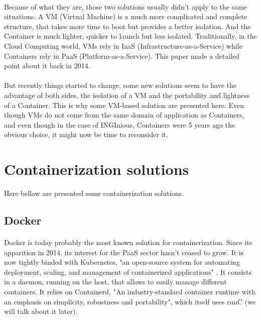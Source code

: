 \paragraph{}Because of what they are, those two solutions usually didn't apply to the same situations.  A VM (Virtual Machine) is a much more complicated and complete structure, that takes more time to boot but provides a better isolation.  And the Container is much lighter, quicker to launch but less isolated.  Traditionally, in the Cloud Computing world, VMs rely in IaaS (Infrastructure-as-a-Service) while Containers rely in PaaS (Platform-as-a-Service).  This paper \cite{dua2014virtualization} made a detailed point about it back in 2014.

\paragraph{}But recently things started to change, some new solutions seem to have the advantage of both sides, the isolation of a VM and the portability and lightness of a Container.  This is why some VM-based solution are presented here.  Even though VMs do not come from the same domain of application as Containers, and even though in the case of INGInious, Containers were 5 years ago the obvious choice, it might now be time to reconsider it.

\section{Containerization solutions}

Here bellow are presented some containerization solutions.

\subsection{Docker}
\paragraph{}Docker\cite{merkel2014docker} is today probably the most known solution for containerization.  Since its apparition in 2014, its interest for the PaaS sector hasn't ceased to grow.  It is now tightly binded with Kubernetes, "an open-source system for automating deployment, scaling, and management of containerized applications" \cite{kubernetes}.  It consists in a daemon, running on the host, that allows to easily manage different containers.  It relies on Containerd, "An industry-standard container runtime with an emphasis on simplicity, robustness and portability"\cite{containerd}, which itself uses runC (we will talk about it later).

